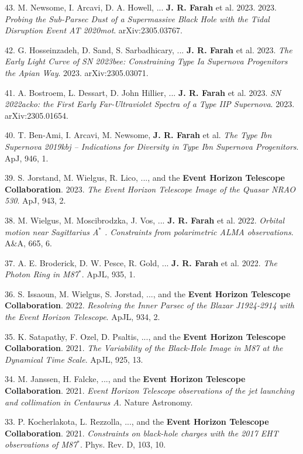 \documentclass[margin,line]{res}
\begin{document}
\begin{resume}
43. M. Newsome, I. Arcavi, D. A. Howell, ... \textbf{J. R. Farah} et al. 2023. 2023.  \textit{Probing the Sub-Parsec Dust of a Supermassive Black Hole with the Tidal Disruption Event AT 2020mot}. arXiv:2305.03767.

42. G. Hosseinzadeh, D. Sand, S. Sarbadhicary, ... \textbf{J. R. Farah} et al. 2023. \textit{The Early Light Curve of SN 2023bee: Constraining Type Ia Supernova Progenitors the Apian Way}. 2023. arXiv:2305.03071. 

41. A. Bostroem, L. Dessart,  D. John Hillier, ... \textbf{J. R. Farah} et al. 2023. \textit{SN 2022acko: the First Early Far-Ultraviolet Spectra of a Type IIP Supernova}. 2023. arXiv:2305.01654.

40. T. Ben-Ami, I. Arcavi, M. Newsome, \textbf{J. R. Farah} et al. \textit{The Type Ibn Supernova 2019kbj -- Indications for Diversity in Type Ibn Supernova Progenitors}. ApJ, 946, 1.

39. S. Jorstand, M. Wielgus, R. Lico, ..., and the \textbf{Event Horizon Telescope Collaboration}. 2023. \textit{The Event Horizon Telescope Image of the Quasar NRAO 530}. ApJ, 943, 2.
 
38. M. Wielgus, M. Moscibrodzka, J. Vos, ... \textbf{J. R. Farah} et al. 2022. \textit{Orbital motion near Sagittarius A$^\ast$ . Constraints from polarimetric ALMA observations}. A\&A, 665, 6.

37. A. E. Broderick, D. W. Pesce, R. Gold, ... \textbf{J. R. Farah} et al. 2022. \textit{The Photon Ring in M87$^\ast$}. ApJL, 935, 1.

36. S. Issaoun, M. Wielgus, S. Jorstad, ..., and the \textbf{Event Horizon Telescope Collaboration}. 2022. \textit{Resolving the Inner Parsec of the Blazar J1924-2914 with the Event Horizon Telescope}. ApJL, 934, 2.

35. K. Satapathy, F. Ozel, D. Psaltis, ..., and the \textbf{Event Horizon Telescope Collaboration}. 2021. \textit{The Variability of the Black-Hole Image in M87 at the Dynamical Time Scale}. ApJL, 925, 13.


34. M. Janssen, H. Falcke, ..., and the \textbf{Event Horizon Telescope Collaboration}. 2021. \textit{Event Horizon Telescope observations of the jet launching and collimation in Centaurus A}. Nature Astronomy.

33. P. Kocherlakota, L. Rezzolla, ..., and the \textbf{Event Horizon Telescope Collaboration}. 2021. \textit{Constraints on black-hole charges with the 2017 EHT observations of M87$^\ast$}. Phys. Rev. D, 103, 10.


\end{resume}
\end{document}
